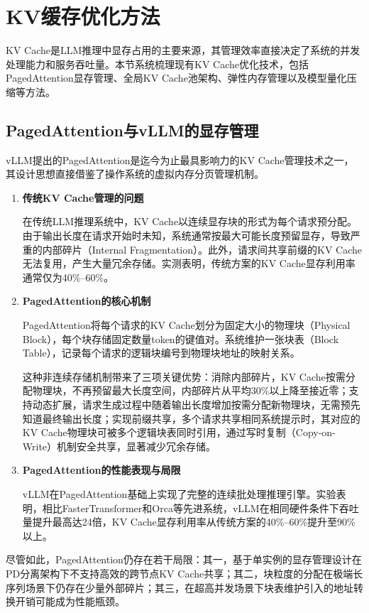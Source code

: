 \section{KV缓存优化方法}

KV Cache是LLM推理中显存占用的主要来源，其管理效率直接决定了系统的并发处理能力和服务吞吐量。本节系统梳理现有KV Cache优化技术，包括PagedAttention显存管理、全局KV Cache池架构、弹性内存管理以及模型量化压缩等方法。

\subsection{PagedAttention与vLLM的显存管理}
\label{sec:pagedattention}

vLLM\cite{kwon2023efficient}提出的PagedAttention是迄今为止最具影响力的KV Cache管理技术之一，其设计思想直接借鉴了操作系统的虚拟内存分页管理机制。

\begin{enumerate}
    
\item \textbf{传统KV Cache管理的问题}

在传统LLM推理系统中，KV Cache以连续显存块的形式为每个请求预分配。由于输出长度在请求开始时未知，系统通常按最大可能长度预留显存，导致严重的内部碎片（Internal Fragmentation）。此外，请求间共享前缀的KV Cache无法复用，产生大量冗余存储。实测表明，传统方案的KV Cache显存利用率通常仅为40\%--60\%\cite{kwon2023efficient,chen2024kvdirect}。

\item \textbf{PagedAttention的核心机制}

PagedAttention将每个请求的KV Cache划分为固定大小的物理块（Physical Block），每个块存储固定数量token的键值对。系统维护一张块表（Block Table），记录每个请求的逻辑块编号到物理块地址的映射关系。

这种非连续存储机制带来了三项关键优势：消除内部碎片，KV Cache按需分配物理块，不再预留最大长度空间，内部碎片从平均30\%以上降至接近零；支持动态扩展，请求生成过程中随着输出长度增加按需分配新物理块，无需预先知道最终输出长度；实现前缀共享，多个请求共享相同系统提示时，其对应的KV Cache物理块可被多个逻辑块表同时引用，通过写时复制（Copy-on-Write）机制安全共享，显著减少冗余存储。

\item \textbf{PagedAttention的性能表现与局限}

vLLM在PagedAttention基础上实现了完整的连续批处理推理引擎。实验表明，相比FasterTransformer和Orca等先进系统，vLLM在相同硬件条件下吞吐量提升最高达24倍，KV Cache显存利用率从传统方案的40\%--60\%提升至90\%以上\cite{kwon2023efficient}。

\end{enumerate}
尽管如此，PagedAttention仍存在若干局限：其一，基于单实例的显存管理设计在PD分离架构下不支持高效的跨节点KV Cache共享；其二，块粒度的分配在极端长序列场景下仍存在少量外部碎片；其三，在超高并发场景下块表维护引入的地址转换开销可能成为性能瓶颈。

